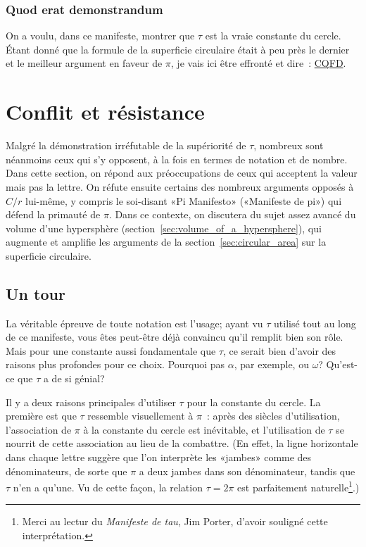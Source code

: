     \subsubsection{Quod erat demonstrandum} %
    \label{sec:quod_erat_demonstrandum}

On a voulu, dans ce manifeste, montrer que $\tau$ est la vraie constante du
cercle. Étant donné que la formule de la superficie circulaire était à peu près
le dernier et le meilleur argument en faveur de $\pi$, je vais ici être
effronté et dire~:
\href{https://fr.wikipedia.org/wiki/CQFD_(math%C3%A9matiques)}{CQFD}.



\section{Conflit et résistance} %
\label{sec:conflict_and_resistance}

Malgré la démonstration irréfutable de la supériorité de $\tau$, nombreux sont
néanmoins ceux qui s'y opposent, à la fois en termes de notation et de nombre. Dans cette
section, on répond aux préoccupations de ceux qui acceptent la valeur mais pas
la lettre. On réfute ensuite certains des nombreux arguments opposés à $C/r$
lui-même, y compris le soi-disant «\ns Pi Manifesto\ns » («\ns Manifeste de pi\ns ») qui
défend la primauté de $\pi$. Dans ce contexte, on discutera du sujet assez
avancé du volume d'une hypersphère
(section~\ref{sec:volume_of_a_hypersphere}), qui augmente et amplifie les
arguments de la section~\ref{sec:circular_area} sur la superficie circulaire.

  \subsection{Un tour} %
  \label{sec:one_turn}

La véritable épreuve de toute notation est l'usage\ns; ayant vu $\tau$
utilisé tout au long de ce manifeste, vous êtes peut-être déjà convaincu qu'il
remplit bien son rôle. Mais pour une constante aussi fondamentale que $\tau$, ce
serait bien d'avoir des raisons plus profondes pour ce choix. Pourquoi pas
$\alpha$, par exemple, ou $\omega$\ns? Qu'est-ce que $\tau$ a de si génial\ns?

Il y a deux raisons principales d'utiliser $\tau$ pour la constante du cercle.
La première est que $\tau$ ressemble visuellement à $\pi$~: après des siècles
d'utilisation, l'association de $\pi$ à la constante du cercle est inévitable,
et l'utilisation de $\tau$ se nourrit de cette association au lieu de la
combattre. (En effet, la ligne horizontale dans chaque lettre suggère que l'on
interprète les «\ns jambes\ns » comme des dénominateurs, de sorte que $\pi$ a deux
jambes dans son dénominateur, tandis que $\tau$ n'en a qu'une. Vu de cette
façon, la relation $\tau = 2\pi$ est parfaitement naturelle\ns\footnote{Merci au
lectur du \emph{Manifeste de tau}, Jim Porter, d'avoir souligné cette
interprétation.}.)

